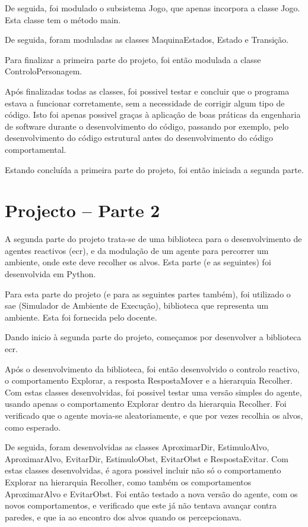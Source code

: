 \documentclass[a4paper,12pt]{article}
\begin{document}
De seguida, foi modulado o subsistema Jogo, que apenas incorpora a classe Jogo.
Esta classe tem o método main.

De seguida, foram moduladas as classes MaquinaEstados, Estado e Transição.

Para finalizar a primeira parte do projeto, foi então modulada a classe ControloPersonagem.

Após finalizadas todas as classes, foi possivel testar e concluir que o programa estava a funcionar corretamente, sem a necessidade de corrigir algum tipo de código. Isto foi apenas possivel graças à aplicação de boas práticas da engenharia de software durante o desenvolvimento do código, passando por exemplo, pelo desenvolvimento do código estrutural antes do desenvolvimento do código comportamental.

Estando concluída a primeira parte do projeto, foi então iniciada a segunda parte.

\newpage
\section{Projecto – Parte 2}
A segunda parte do projeto trata-se de uma biblioteca para o desenvolvimento de agentes reactivos (ecr), e da modulação de um agente para percorrer um ambiente, onde este deve recolher os alvos. Esta parte (e as seguintes) foi desenvolvida em Python.

Para esta parte do projeto (e para as seguintes partes também), foi utilizado o sae (Simulador de Ambiente de Execução), biblioteca que representa um ambiente. Esta foi fornecida pelo docente.

Dando inicio à segunda parte do projeto, começamos por desenvolver a biblioteca ecr.

Após o desenvolvimento da biblioteca, foi então desenvolvido o controlo reactivo, o comportamento Explorar, a resposta RespostaMover e a hierarquia Recolher.
Com estas classes desenvolvidas, foi possivel testar uma versão simples do agente, usando apenas o comportamento Explorar dentro da hierarquia Recolher. Foi verificado que o agente movia-se aleatoriamente, e que por vezes recolhia os alvos, como esperado.

De seguida, foram desenvolvidas as classes AproximarDir, EstimuloAlvo, AproximarAlvo, EvitarDir, EstimuloObst, EvitarObst e RespostaEvitar.
Com estas classes desenvolvidas, é agora possivel incluir não só o comportamento Explorar na hierarquia Recolher, como também os comportamentos AproximarAlvo e EvitarObst. Foi então testado a nova versão do agente, com os novos comportamentos, e verificado que este já não tentava avançar contra paredes, e que ia ao encontro dos alvos quando os percepcionava.
\end{document}
